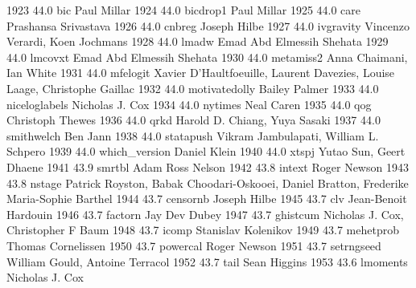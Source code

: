   1923     44.0    bic           Paul Millar                             
  1924     44.0    bicdrop1      Paul Millar                             
  1925     44.0    care          Prashansa Srivastava                    
  1926     44.0    cnbreg        Joseph Hilbe                            
  1927     44.0    ivgravity     Vincenzo Verardi, Koen Jochmans         
  1928     44.0    lmadw         Emad Abd Elmessih Shehata               
  1929     44.0    lmcovxt       Emad Abd Elmessih Shehata               
  1930     44.0    metamiss2     Anna Chaimani, Ian White                
  1931     44.0    mfelogit      Xavier D'Haultfoeuille, Laurent         
                                   Davezies, Louise Laage, Christophe      
                                   Gaillac                                 
  1932     44.0    motivatedolly  Bailey Palmer                           
  1933     44.0    niceloglabels  Nicholas J. Cox                         
  1934     44.0    nytimes       Neal Caren                              
  1935     44.0    qog           Christoph Thewes                        
  1936     44.0    qrkd          Harold D. Chiang, Yuya Sasaki           
  1937     44.0    smithwelch    Ben Jann                                
  1938     44.0    statapush     Vikram Jambulapati, William L. Schpero  
  1939     44.0    which_version  Daniel Klein                            
  1940     44.0    xtspj         Yutao Sun, Geert Dhaene                 
  1941     43.9    smrtbl        Adam Ross Nelson                        
  1942     43.8    intext        Roger Newson                            
  1943     43.8    nstage        Patrick Royston, Babak                  
                                   Choodari-Oskooei, Daniel Bratton,       
                                   Frederike Maria-Sophie Barthel          
  1944     43.7    censornb      Joseph Hilbe                            
  1945     43.7    clv           Jean-Benoit Hardouin                    
  1946     43.7    factorn       Jay Dev Dubey                           
  1947     43.7    ghistcum      Nicholas J. Cox, Christopher F Baum     
  1948     43.7    icomp         Stanislav Kolenikov                     
  1949     43.7    mehetprob     Thomas Cornelissen                      
  1950     43.7    powercal      Roger Newson                            
  1951     43.7    setrngseed    William Gould, Antoine Terracol         
  1952     43.7    tail          Sean Higgins                            
  1953     43.6    lmoments      Nicholas J. Cox                         
